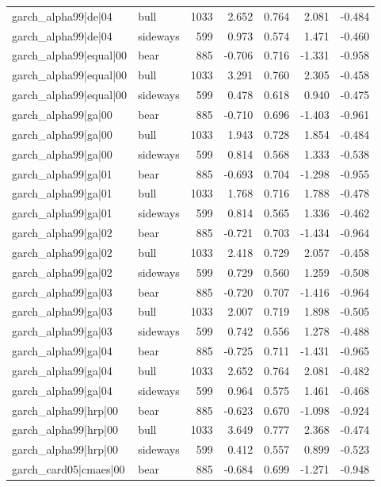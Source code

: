 \begin{table}
\begin{tabular}{llrrrrr}
garch\_alpha99|de|04 & bull & 1033 & 2.652 & 0.764 & 2.081 & -0.484 \\
garch\_alpha99|de|04 & sideways & 599 & 0.973 & 0.574 & 1.471 & -0.460 \\
garch\_alpha99|equal|00 & bear & 885 & -0.706 & 0.716 & -1.331 & -0.958 \\
garch\_alpha99|equal|00 & bull & 1033 & 3.291 & 0.760 & 2.305 & -0.458 \\
garch\_alpha99|equal|00 & sideways & 599 & 0.478 & 0.618 & 0.940 & -0.475 \\
garch\_alpha99|ga|00 & bear & 885 & -0.710 & 0.696 & -1.403 & -0.961 \\
garch\_alpha99|ga|00 & bull & 1033 & 1.943 & 0.728 & 1.854 & -0.484 \\
garch\_alpha99|ga|00 & sideways & 599 & 0.814 & 0.568 & 1.333 & -0.538 \\
garch\_alpha99|ga|01 & bear & 885 & -0.693 & 0.704 & -1.298 & -0.955 \\
garch\_alpha99|ga|01 & bull & 1033 & 1.768 & 0.716 & 1.788 & -0.478 \\
garch\_alpha99|ga|01 & sideways & 599 & 0.814 & 0.565 & 1.336 & -0.462 \\
garch\_alpha99|ga|02 & bear & 885 & -0.721 & 0.703 & -1.434 & -0.964 \\
garch\_alpha99|ga|02 & bull & 1033 & 2.418 & 0.729 & 2.057 & -0.458 \\
garch\_alpha99|ga|02 & sideways & 599 & 0.729 & 0.560 & 1.259 & -0.508 \\
garch\_alpha99|ga|03 & bear & 885 & -0.720 & 0.707 & -1.416 & -0.964 \\
garch\_alpha99|ga|03 & bull & 1033 & 2.007 & 0.719 & 1.898 & -0.505 \\
garch\_alpha99|ga|03 & sideways & 599 & 0.742 & 0.556 & 1.278 & -0.488 \\
garch\_alpha99|ga|04 & bear & 885 & -0.725 & 0.711 & -1.431 & -0.965 \\
garch\_alpha99|ga|04 & bull & 1033 & 2.652 & 0.764 & 2.081 & -0.482 \\
garch\_alpha99|ga|04 & sideways & 599 & 0.964 & 0.575 & 1.461 & -0.468 \\
garch\_alpha99|hrp|00 & bear & 885 & -0.623 & 0.670 & -1.098 & -0.924 \\
garch\_alpha99|hrp|00 & bull & 1033 & 3.649 & 0.777 & 2.368 & -0.474 \\
garch\_alpha99|hrp|00 & sideways & 599 & 0.412 & 0.557 & 0.899 & -0.523 \\
garch\_card05|cmaes|00 & bear & 885 & -0.684 & 0.699 & -1.271 & -0.948 \\

\end{tabular}
\end{table}
